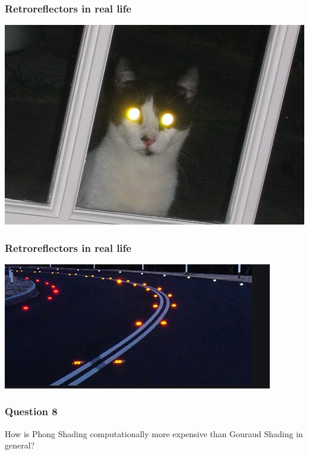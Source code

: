 \documentclass{beamer}
\begin{document}
\begin{frame}
    \frametitle{Retroreflectors in real life}

    \begin{center}
        \includegraphics[scale=0.6]{cat-eye.jpg}
    \end{center}

\end{frame}

\begin{frame}
    \frametitle{Retroreflectors in real life}

    \begin{center}
        \includegraphics[scale=0.4]{road-cat-eye.png}
    \end{center}

\end{frame}

\begin{frame}
    \frametitle{Question 8}

    How is Phong Shading computationally more expensive than Gouraud Shading in general?

\end{frame}
\end{document}
